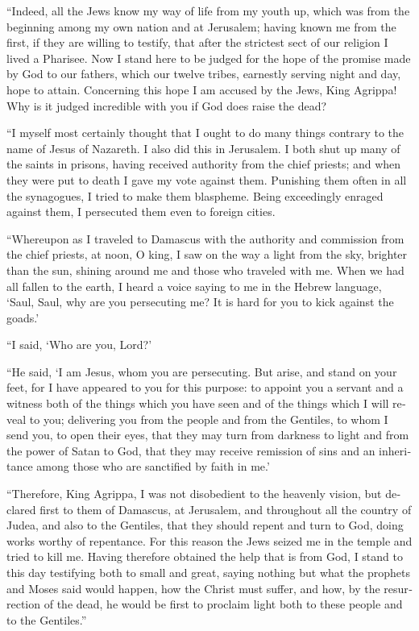 \begin{paracol}{2}
\begin{otherlanguage}{english}
 ``Indeed, all the Jews know my way of life from my youth
up, which was from the beginning among my own nation and at Jerusalem;
 having known me from the first, if they are willing to
testify, that after the strictest sect of our religion I lived a
Pharisee.  Now I stand here to be judged for the hope of
the promise made by God to our fathers,  which our twelve
tribes, earnestly serving night and day, hope to attain. Concerning this
hope I am accused by the Jews, King Agrippa!  Why is it
judged incredible with you if God does raise the dead?

 ``I myself most certainly thought that I ought to do many
things contrary to the name of Jesus of Nazareth.  I also
did this in Jerusalem. I both shut up many of the saints in prisons,
having received authority from the chief priests; and when they were put
to death I gave my vote against them.  Punishing them
often in all the synagogues, I tried to make them blaspheme. Being
exceedingly enraged against them, I persecuted them even to foreign
cities.

 ``Whereupon as I traveled to Damascus with the authority
and commission from the chief priests,  at noon, O king,
I saw on the way a light from the sky, brighter than the sun, shining
around me and those who traveled with me.  When we had
all fallen to the earth, I heard a voice saying to me in the Hebrew
language, `Saul, Saul, why are you persecuting me? It is hard for you to
kick against the goads.'

 ``I said, `Who are you, Lord?'

``He said, `I am Jesus, whom you are persecuting.  But
arise, and stand on your feet, for I have appeared to you for this
purpose: to appoint you a servant and a witness both of the things which
you have seen and of the things which I will reveal to you;
 delivering you from the people and from the Gentiles, to
whom I send you,  to open their eyes, that they may turn
from darkness to light and from the power of Satan to God, that they may
receive remission of sins and an inheritance among those who are
sanctified by faith in me.'

 ``Therefore, King Agrippa, I was not disobedient to the
heavenly vision,  but declared first to them of Damascus,
at Jerusalem, and throughout all the country of Judea, and also to the
Gentiles, that they should repent and turn to God, doing works worthy of
repentance.  For this reason the Jews seized me in the
temple and tried to kill me.  Having therefore obtained
the help that is from God, I stand to this day testifying both to small
and great, saying nothing but what the prophets and Moses said would
happen,  how the Christ must suffer, and how, by the
resurrection of the dead, he would be first to proclaim light both to
these people and to the Gentiles.''


\end{otherlanguage}
\end{paracol}
